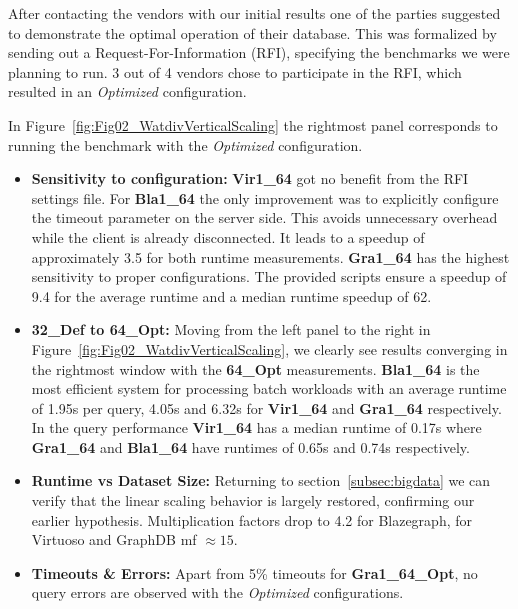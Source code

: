 %

After contacting the vendors with our initial results one of the parties suggested to demonstrate the optimal operation of their database. 
This was formalized by sending out a Request-For-Information (RFI), specifying the benchmarks we were planning to run.
3 out of 4 vendors chose to participate in the RFI, which resulted in an \emph{Optimized} configuration. 

In Figure~\ref{fig:Fig02_WatdivVerticalScaling} the rightmost panel corresponds to running the benchmark with the \emph{Optimized} configuration.

%
%
%
\begin{itemize}
	\item \textbf{Sensitivity to configuration:} \textbf{Vir1\_64} got no benefit from the RFI settings file. For 
	\textbf{Bla1\_64} the only improvement was to explicitly configure the timeout parameter on the server side. This avoids unnecessary overhead while the client is already disconnected. It leads to a speedup of approximately 3.5 for both runtime measurements. \textbf{Gra1\_64} has the highest sensitivity to proper configurations. The provided scripts ensure a speedup of 9.4 for the average runtime and a median runtime speedup of 62.
	\item \textbf{32\_Def to 64\_Opt:} Moving from the left panel to the right in Figure~\ref{fig:Fig02_WatdivVerticalScaling}, we clearly see results converging in the rightmost window with the \textbf{64\_Opt} measurements. \textbf{Bla1\_64} is the most efficient system for processing batch workloads with an average runtime of 1.95s per query, 4.05s and 6.32s for \textbf{Vir1\_64} and \textbf{Gra1\_64} respectively. In the query performance \textbf{Vir1\_64} has a median runtime of 0.17s where \textbf{Gra1\_64} and \textbf{Bla1\_64} have runtimes of 0.65s and 0.74s respectively.
	\item \textbf{Runtime vs Dataset Size:} Returning to section~\ref{subsec:bigdata} we can verify that the linear scaling behavior is largely restored, confirming our earlier hypothesis. Multiplication factors drop to 4.2 for Blazegraph, for Virtuoso and GraphDB mf $ \approx 15$.
\item \textbf{Timeouts \& Errors:} Apart from 5\% timeouts for \textbf{Gra1\_64\_Opt}, no query errors are observed with the \emph{Optimized} configurations.
\end{itemize}

